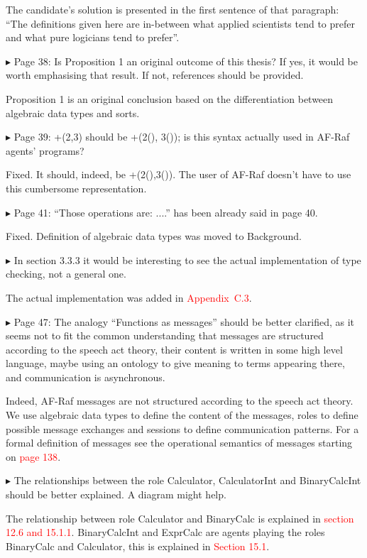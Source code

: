 \documentclass{article}
\newcommand*\R[1]{\textcolor{red}{#1}} %
\newenvironment{them}%
  {\bigskip\noindent\begingroup\color{blue}$\blacktriangleright$\enspace}%
  {\endgroup\par}
\begin{document}
The candidate's solution is presented in the first sentence of that paragraph:
``The definitions given here are in-between what applied scientists tend to
prefer and what pure logicians tend to prefer''.

\begin{them}
Page 38:
Is Proposition 1 an original outcome of this thesis? If yes, it would be worth
emphasising that result. If not, references should be provided.
\end{them}
Proposition 1 is an original conclusion based on the differentiation between
algebraic data types and sorts. 

\begin{them}
Page 39:
+(2,3) should be +(2(), 3()); is this syntax actually used in AF-Raf agents'
programs?
\end{them}

Fixed. It should, indeed, be +(2(),3()). The user of AF-Raf doesn't have to use
this cumbersome representation.

\begin{them}
Page 41:
``Those operations are: ....'' has been already said in page 40.
\end{them}

Fixed. Definition of algebraic data types was moved to Background.

\begin{them}
In section 3.3.3 it would be interesting to see the actual implementation of
type checking, not a general one.
\end{them}

The actual implementation was added in \R{Appendix~C.3}.

\begin{them}
Page 47:
The analogy ``Functions as messages'' should be better clarified, as it seems not
to fit the common understanding that messages are structured according to the
speech act theory, their content is written in some high level language, maybe
using an ontology to give meaning to terms appearing there, and communication
is asynchronous.
\end{them}
Indeed, AF-Raf messages are not structured according to  the speech act
theory.  We use algebraic data types to define the content of the messages,
roles to define possible message exchanges and sessions to define communication
patterns. For a formal definition of messages see the operational semantics of
messages starting on \R{page 138}.

\begin{them}
The relationships between the role Calculator, CalculatorInt and BinaryCalcInt
should be better explained. A diagram might help.
\end{them}
The relationship between role Calculator and BinaryCalc is explained in
\R{section 12.6 and 15.1.1}. BinaryCalcInt and ExprCalc are agents playing the
roles BinaryCalc and Calculator, this is explained in \R{Section 15.1}.
\end{document}
